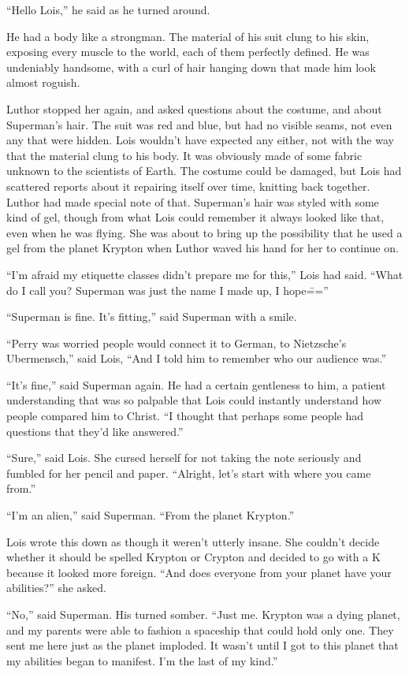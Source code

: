 \documentclass[ebook,12pt]{memoir}
\begin{document}
``Hello Lois,'' he said as he turned around.

He had a body like a strongman. The material of his suit clung to his
skin, exposing every muscle to the world, each of them perfectly
defined. He was undeniably handsome, with a curl of hair hanging down
that made him look almost roguish.

Luthor stopped her again, and asked questions about the costume, and
about Superman's hair. The suit was red and blue, but had no visible
seams, not even any that were hidden. Lois wouldn't have expected any
either, not with the way that the material clung to his body. It was
obviously made of some fabric unknown to the scientists of Earth. The
costume could be damaged, but Lois had scattered reports about it
repairing itself over time, knitting back together. Luthor had made
special note of that. Superman's hair was styled with some kind of gel,
though from what Lois could remember it always looked like that, even
when he was flying. She was about to bring up the possibility that he
used a gel from the planet Krypton when Luthor waved his hand for her to
continue on.

``I'm afraid my etiquette classes didn't prepare me for this,'' Lois had
said. ``What do I call you? Superman was just the name I made up, I
hope\===''

``Superman is fine. It's fitting,'' said Superman with a smile.

``Perry was worried people would connect it to German, to Nietzsche's
Ubermensch,'' said Lois, ``And I told him to remember who our audience
was.''

``It's fine,'' said Superman again. He had a certain gentleness to him,
a patient understanding that was so palpable that Lois could instantly
understand how people compared him to Christ. ``I thought that perhaps
some people had questions that they'd like answered.''

``Sure,'' said Lois. She cursed herself for not taking the note
seriously and fumbled for her pencil and paper. ``Alright, let's start
with where you came from.''

``I'm an alien,'' said Superman. ``From the planet Krypton.''

Lois wrote this down as though it weren't utterly insane. She couldn't
decide whether it should be spelled Krypton or Crypton and decided to go
with a K because it looked more foreign. ``And does everyone from your
planet have your abilities?'' she asked.

``No,'' said Superman. His turned somber. ``Just me. Krypton was a dying
planet, and my parents were able to fashion a spaceship that could hold
only one. They sent me here just as the planet imploded. It wasn't until
I got to this planet that my abilities began to manifest. I'm the last
of my kind.''
\end{document}
